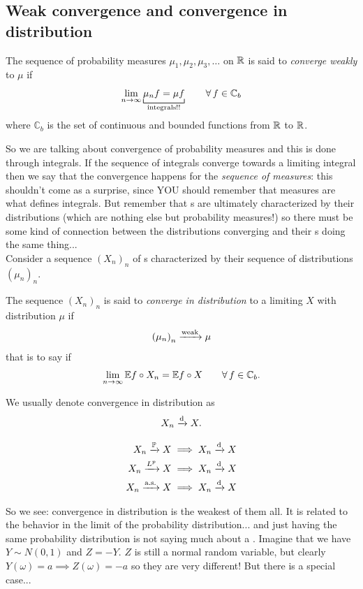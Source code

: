 \documentclass{report}
\begin{document}
\subsection{Weak convergence and convergence in distribution}
\begin{definition}
	The sequence of probability measures $\mu_1,\mu_2,\mu_3,\ldots$ on $\mathbb{R}$ is said to \emph{converge weakly} to $\mu$ if
	\[ \lim_{n\to\infty}\underbracket[0.6pt][4pt]{\mu_n f=\mu f}_{\mathclap{\text{integrals!!}}}\qquad\every f\in\mathbb{C}_{b}\]
	where $\mathbb{C}_b$ is the set of continuous and bounded functions from $\mathbb{R}$ to $\mathbb{R}$.
\end{definition}
So we are talking about convergence of probability measures and this is done through integrals. If the sequence of integrals converge towards a limiting integral then we say that the convergence happens for the \textit{sequence of measures}: this shouldn't come as a surprise, since YOU should remember that measures are what defines integrals. But remember that \rv s are ultimately characterized by their distributions (which are nothing else but probability measures!) so there must be some kind of connection between the distributions converging and their \rv s doing the same thing...\\
Consider a sequence ${(X_n)}_{n}$ of \rv s characterized by their sequence of distributions ${(\mu_{n})}_{n}$.
\begin{definition}
	The sequence ${(X_n)}_{n}$ is said to \emph{converge in distribution} to a limiting \rv{} $X$ with distribution $\mu$ if
	\[{(\mu_n)}_{n}\xrightarrow[]{\mathrm{weak}}\mu\]
	that is to say if
	\[\lim_{n\to\infty}\mathbb{E} f\circ X_n=\mathbb{E} f\circ X \qquad\forall\, f\in\mathbb{C}_{b}.\]
\end{definition}
\begin{notation}
	We usually denote convergence in distribution as
	\[X_n\xrightarrow[]{\text{d}} X.\]
\end{notation}
\begin{remark}
	\begin{align*}
	X_n\xrightarrow[]{\mathbb{P}} X&\implies X_n\xrightarrow[]{\text{d}} X\\
	X_n\xrightarrow[]{L^{p}} X&\implies X_n\xrightarrow[]{\text{d}} X\\
	X_n\xrightarrow[]{\text{a.s.}} X&\implies X_n\xrightarrow[]{\text{d}} X\\
\end{align*}
\end{remark}
So we see: convergence in distribution is the weakest of them all. It is related to the behavior in the limit of the probability distribution... and just having the same probability distribution is not saying much about a \rv. Imagine that we have $Y\sim N(0,1)$ and $Z=-Y$. $Z$ is still a normal random variable, but clearly $Y(\omega)=a\implies Z(\omega)=-a$ so they are very different! But there is a special case...
\end{document}
